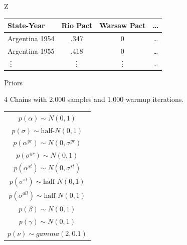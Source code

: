 \documentclass{beamer}
\begin{document}


\begin{frame}[standout]{Z} 

\begin{tabular}{lccc}
State-Year & Rio Pact & Warsaw Pact & \ldots \\
\hline
Argentina 1954 & .347 & 0 & \ldots \\
Argentina 1955 & .418  & 0 & \ldots  \\
 \vdots & \vdots & \vdots & \ldots  
\end{tabular}

 \end{frame}




\begin{frame}{Priors}

4 Chains with 2,000 samples and 1,000 warmup iterations. 

\begin{table} %

 \begin{center}
\begin{tabular}{c} 
$ p(\alpha) \sim N(0, 1)$  \\
$ p(\sigma) \sim \mbox{half-}N(0, 1) $ \\
$ p(\alpha^{yr}) \sim N(0, \sigma^{yr}) $ \\ 
$ p(\sigma^{yr}) \sim N(0, 1) $ \\
$ p(\alpha^{st}) \sim N(0, \sigma^{st}) $ \\ 
$ p(\sigma^{st}) \sim \mbox{half-}N(0, 1) $ \\ 
$ p(\sigma^{all}) \sim \mbox{half-}N(0, 1) $ \\
$ p(\beta) \sim N(0, 1) $ \\
$ p(\gamma) \sim N(0, 1) $ \\ 
$ p(\nu) \sim gamma(2, 0.1)$ 
\end{tabular} 
\end{center} 
\label{tab:priors}
\end{table} 


\end{frame}


\end{document}
